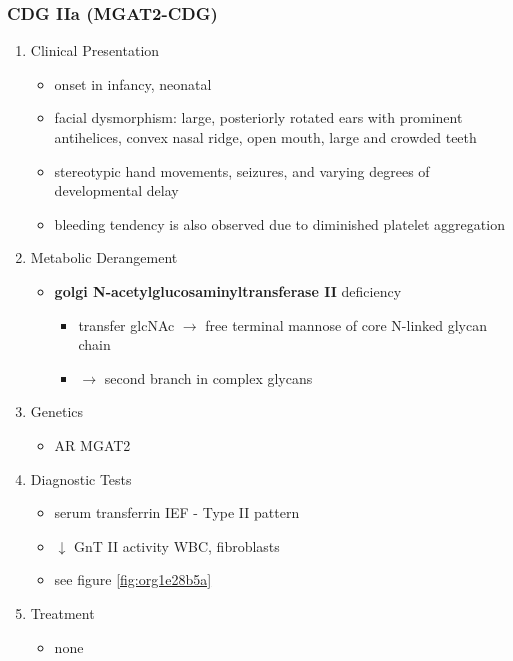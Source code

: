 \documentclass[12pt]{scrartcl}
\begin{document}
\subsubsection{CDG IIa (MGAT2-CDG)}
\label{sec:org54c4ffd}
\begin{enumerate}
\item Clinical Presentation
\label{sec:orge399bf1}
\begin{itemize}
\item onset in infancy, neonatal
\item facial dysmorphism: large, posteriorly rotated ears with prominent
antihelices, convex nasal ridge, open mouth, large and crowded
teeth
\item stereotypic hand movements, seizures, and varying degrees of
developmental delay
\item bleeding tendency is also observed due to diminished platelet
aggregation
\end{itemize}

\item Metabolic Derangement
\label{sec:orgb8d6db5}
\begin{itemize}
\item \textbf{golgi N-acetylglucosaminyltransferase II} deficiency
\begin{itemize}
\item transfer glcNAc \(\to\) free terminal mannose of core N-linked glycan chain
\item \(\to\) second branch in complex glycans
\end{itemize}
\end{itemize}
\item Genetics
\label{sec:org7fba47d}
\begin{itemize}
\item AR MGAT2
\end{itemize}
\item Diagnostic Tests
\label{sec:org7d5a066}
\begin{itemize}
\item serum transferrin IEF - Type II pattern
\item \(\downarrow\) GnT II activity WBC, fibroblasts
\item see figure \ref{fig:org1e28b5a}
\end{itemize}
\item Treatment
\label{sec:orga4be886}
\begin{itemize}
\item none
\end{itemize}
\end{enumerate}
\end{document}
